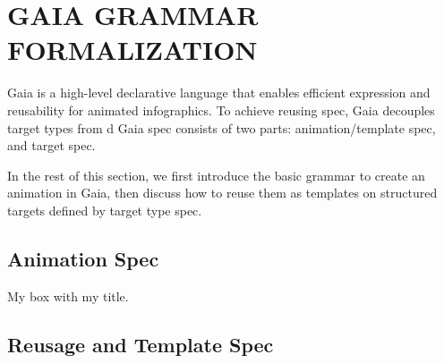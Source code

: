 \section{GAIA GRAMMAR FORMALIZATION}
\label{sec:gaia_grammar_formalization}

Gaia is a high-level declarative language that enables efficient expression and reusability for animated infographics.
To achieve reusing spec, Gaia decouples target types from d
Gaia spec consists of two parts: animation/template spec, and target spec.


In the rest of this section, we first introduce the basic grammar to create an animation in Gaia, then discuss how to reuse them as templates on structured targets defined by target type spec.

\subsection{Animation Spec}


\begin{tcolorbox}[colback=white!5!white,colframe=yellow!75!black,title=Example - Part 1]
  My box with my title.
\end{tcolorbox}


\subsection{Reusage and Template Spec}


